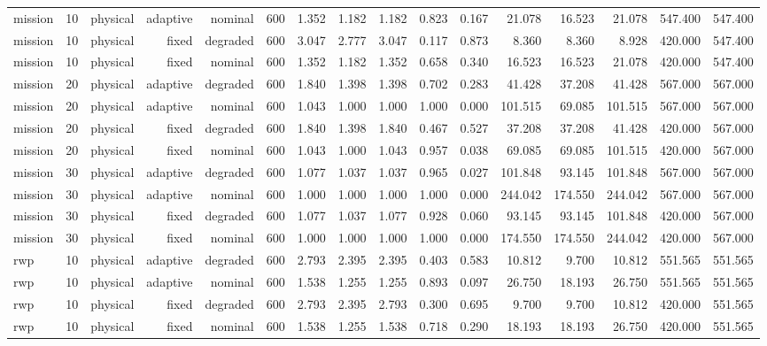\begin{tabular}{lrrrrrrrrrrrrrrr}
mission & 10 & physical & adaptive & nominal & 600 & 1.352 & 1.182 & 1.182 & 0.823 & 0.167 & 21.078 & 16.523 & 21.078 & 547.400 & 547.400 \\
mission & 10 & physical & fixed & degraded & 600 & 3.047 & 2.777 & 3.047 & 0.117 & 0.873 & 8.360 & 8.360 & 8.928 & 420.000 & 547.400 \\
mission & 10 & physical & fixed & nominal & 600 & 1.352 & 1.182 & 1.352 & 0.658 & 0.340 & 16.523 & 16.523 & 21.078 & 420.000 & 547.400 \\
mission & 20 & physical & adaptive & degraded & 600 & 1.840 & 1.398 & 1.398 & 0.702 & 0.283 & 41.428 & 37.208 & 41.428 & 567.000 & 567.000 \\
mission & 20 & physical & adaptive & nominal & 600 & 1.043 & 1.000 & 1.000 & 1.000 & 0.000 & 101.515 & 69.085 & 101.515 & 567.000 & 567.000 \\
mission & 20 & physical & fixed & degraded & 600 & 1.840 & 1.398 & 1.840 & 0.467 & 0.527 & 37.208 & 37.208 & 41.428 & 420.000 & 567.000 \\
mission & 20 & physical & fixed & nominal & 600 & 1.043 & 1.000 & 1.043 & 0.957 & 0.038 & 69.085 & 69.085 & 101.515 & 420.000 & 567.000 \\
mission & 30 & physical & adaptive & degraded & 600 & 1.077 & 1.037 & 1.037 & 0.965 & 0.027 & 101.848 & 93.145 & 101.848 & 567.000 & 567.000 \\
mission & 30 & physical & adaptive & nominal & 600 & 1.000 & 1.000 & 1.000 & 1.000 & 0.000 & 244.042 & 174.550 & 244.042 & 567.000 & 567.000 \\
mission & 30 & physical & fixed & degraded & 600 & 1.077 & 1.037 & 1.077 & 0.928 & 0.060 & 93.145 & 93.145 & 101.848 & 420.000 & 567.000 \\
mission & 30 & physical & fixed & nominal & 600 & 1.000 & 1.000 & 1.000 & 1.000 & 0.000 & 174.550 & 174.550 & 244.042 & 420.000 & 567.000 \\
rwp & 10 & physical & adaptive & degraded & 600 & 2.793 & 2.395 & 2.395 & 0.403 & 0.583 & 10.812 & 9.700 & 10.812 & 551.565 & 551.565 \\
rwp & 10 & physical & adaptive & nominal & 600 & 1.538 & 1.255 & 1.255 & 0.893 & 0.097 & 26.750 & 18.193 & 26.750 & 551.565 & 551.565 \\
rwp & 10 & physical & fixed & degraded & 600 & 2.793 & 2.395 & 2.793 & 0.300 & 0.695 & 9.700 & 9.700 & 10.812 & 420.000 & 551.565 \\
rwp & 10 & physical & fixed & nominal & 600 & 1.538 & 1.255 & 1.538 & 0.718 & 0.290 & 18.193 & 18.193 & 26.750 & 420.000 & 551.565 \\

\end{tabular}
